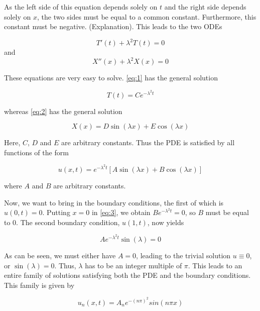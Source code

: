 \documentclass{article}
\begin{document}
As the left side of this equation depends solely on $t$ and the right side depends solely on $x$, the two sides must be equal to a common constant. Furthermore, this constant must be negative. (Explanation). This leads to the two ODEs

\begin{equation}
    T'(t) + \lambda^2 T(t) = 0\label{eq:1}
\end{equation}
and
\begin{equation}
    X''(x) + \lambda^2 X(x) = 0\label{eq:2}
\end{equation}

These equations are very easy to solve. \eqref{eq:1} has the general solution

\begin{equation}
    T(t) = C e^{-\lambda^2 t}
\end{equation}

whereas \eqref{eq:2} has the general solution

\begin{equation}
    X(x) = D \sin(\lambda x) + E \cos(\lambda x)
\end{equation}

Here, $C$, $D$ and $E$ are arbitrary constants. Thus the PDE is satisfied by all functions of the form

\begin{equation}
    u(x, t) = e^{-\lambda^2 t}[A \sin(\lambda x) + B \cos(\lambda x)]\label{eq:3}
\end{equation}

where $A$ and $B$ are arbitrary constants.

Now, we want to bring in the boundary conditions, the first of which is $u(0, t) = 0$. Putting $x=0$ in \eqref{eq:3}, we obtain $B e^{-\lambda^2 t} = 0$, so $B$ must be equal to 0. The second boundary condition, $u(1, t)$, now yields

\begin{equation}
    A e^{-\lambda^2 t} \sin(\lambda) = 0
\end{equation}

As can be seen, we must either have $A=0$, leading to the trivial solution $u\equiv 0$, or $\sin(\lambda) = 0$. Thus, $\lambda$ has to be an integer multiple of $\pi$. This leads to an entire family of solutions satisfying both the PDE and the boundary conditions. This family is given by

\begin{equation}
    u_n(x, t) = A_n e^{-(n \pi)^2} sin(n \pi x)
\end{equation}
\end{document}
